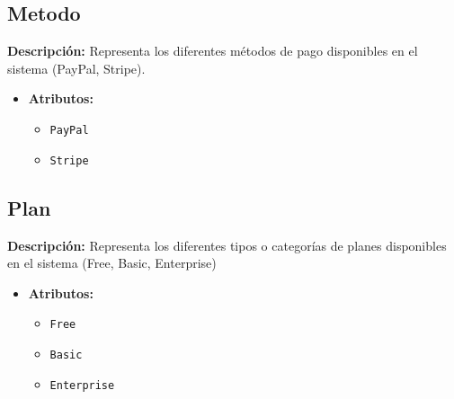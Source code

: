 \documentclass[12pt.a4paper]{article}
\begin{document}
\subsection{Metodo}
     \textbf{Descripción:} Representa los diferentes métodos de pago disponibles en el sistema (PayPal, Stripe).
    \begin{itemize}
        \item {\textbf{Atributos:}}
        \begin{itemize}
            \item \texttt{PayPal}
            \item \texttt{Stripe}
        \end{itemize}
    \end{itemize}


\subsection{Plan}
     \textbf{Descripción:}  Representa los diferentes tipos o categorías de planes disponibles en el sistema (Free, Basic, Enterprise)
    \begin{itemize}
        \item {\textbf{Atributos:}}
        \begin{itemize}
            \item \texttt{Free}
            \item \texttt{Basic}
            \item \texttt{Enterprise}
        \end{itemize}
    \end{itemize}
\end{document}
